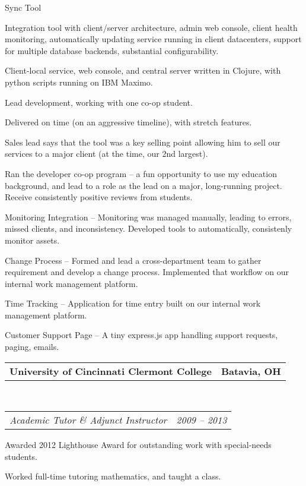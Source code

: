 \documentclass[10pt,letterpaper]{article}
\makeatletter
\newcommand{\headerrow}[2]
{\begin{tabular*}{\linewidth}{l@{\extracolsep{\fill}}r}
	#1 &
	#2 \\
\end{tabular*}}
\makeatother
\begin{document}
\begin{itemize}
\begin{itemize*}
	\item Sync Tool

          \begin{itemize*}
          \item Integration tool with client/server architecture, admin web console, client health monitoring, automatically updating service running in client datacenters, support for multiple database backends, substantial configurability.
          \item Client-local service, web console, and central server written in Clojure, with python scripts running on IBM Maximo.
          \item Lead development, working with one co-op student.
          \item Delivered on time (on an aggressive timeline), with stretch features.
          \item Sales lead says that the tool was a key selling point allowing him to sell our services to a major client (at the time, our 2nd largest).
          \end{itemize*}

          \item Ran the developer co-op program -- a fun opportunity to use my education background, and lead to a role as the lead on a major, long-running project.  Receive consistently positive reviews from students.
          \item Monitoring Integration -- Monitoring was managed manually, leading to errors, missed clients, and inconsistency.  Developed tools to automatically, consistenly monitor assets.
          \item Change Process -- Formed and lead a cross-department team to gather requirement and develop a change process.  Implemented that workflow on our internal work management platform.
          \item Time Tracking -- Application for time entry built on our internal work management platform.
          \item Customer Support Page -- A tiny express.js app handling support requests, paging, emails.

	\end{itemize*}

	\item
	\headerrow
		{\textbf{University of Cincinnati Clermont College}}
		{\textbf{Batavia, OH}}
	\\
	\headerrow
		{\emph{Academic Tutor \& Adjunct Instructor}}
		{\emph{2009 -- 2013}}
	\begin{itemize*}
		\item Awarded 2012 Lighthouse Award for outstanding work with special-needs students.
		\item Worked full-time tutoring mathematics, and taught a class.
	\end{itemize*}

\end{itemize}
\end{document}
